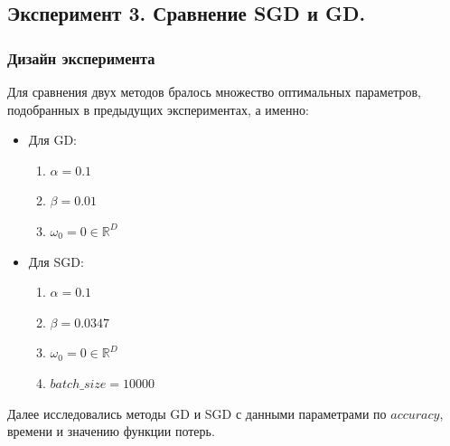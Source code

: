 \subsection{Эксперимент 3. Сравнение SGD и GD.}
\subsubsection{Дизайн эксперимента}
Для сравнения двух методов бралось множество оптимальных параметров, подобранных в предыдущих экспериментах, а именно:
\begin{itemize}
	\item Для GD:
	\begin{enumerate}
		\item $\alpha = 0.1$
		\item  $\beta = 0.01$
		\item  $\omega_0 = 0 \in \mathbb{R}^D$
	\end{enumerate}
	\item Для SGD:
	\begin{enumerate}
		\item $\alpha = 0.1$
		\item  $\beta = 0.0347$
		\item  $\omega_0 = 0 \in \mathbb{R}^D$
		\item  $batch\_size = 10000 $
	\end{enumerate}
\end{itemize}

Далее исследовались методы GD и SGD с данными параметрами по $accuracy$, времени и значению функции потерь.

